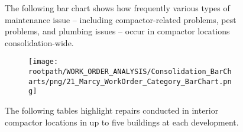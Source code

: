\begin{figure}[h]
                                \sf
                                The following bar chart shows how frequently various types of maintenance issue -- including compactor-related problems, pest problems, and plumbing issues -- occur in compactor locations consolidation-wide.
                                \raggedright
                                \begin{subfigure}{\textwidth}
                                \texttt{[image: \\rootpath/WORK\_ORDER\_ANALYSIS/Consolidation\_BarCharts/png/21\_Marcy\_WorkOrder\_Category\_BarChart.png]}
                                \end{subfigure}
                                \end{figure}
\begin{figure}[h]
                                \raggedright
                                \sf
                                The following tables highlight repairs conducted in interior compactor locations in up to five buildings at each development.\\
                                
\end{figure}
